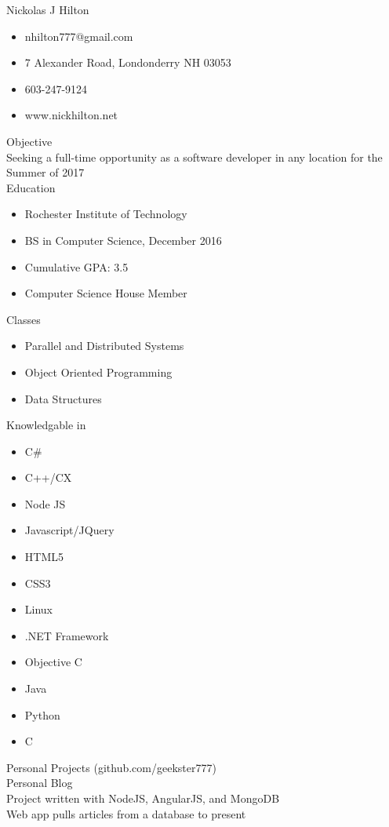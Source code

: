 \documentclass{article}
\begin{document}
{\LARGE Nickolas J Hilton } 
\begin{itemize}
  \item nhilton777@gmail.com 
  \item 7 Alexander Road, Londonderry NH 03053 
  \item 603-247-9124 
  \item www.nickhilton.net 
\end{itemize}
{\Large Objective} \\ 
Seeking a full-time opportunity as a software developer in any location for the 
Summer of 2017 \\
{\Large Education } 
\begin{itemize}
  \item Rochester Institute of Technology 
  \item BS in Computer Science, December 2016 
  \item Cumulative GPA: 3.5 
  \item Computer Science House Member 
\end{itemize}
{\Large Classes } 
\begin{itemize}
  \item Parallel and Distributed Systems 
  \item Object Oriented Programming 
  \item Data Structures 
\end{itemize}
{\Large Knowledgable in } 
\begin {itemize}
  \item C\# 
  \item C++/CX 
  \item Node JS 
  \item Javascript/JQuery 
  \item HTML5 
  \item CSS3 
  \item Linux
  \item .NET Framework 
  \item Objective C 
  \item Java 
  \item Python 
  \item C 
\end{itemize}
{\Large Personal Projects (github.com/geekster777) } \\ 
{\large Personal Blog } \\
Project written with NodeJS, AngularJS, and MongoDB \\
Web app pulls articles from a database to present \\
\end{document}
